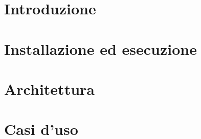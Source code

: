 \documentclass[a4paper, oneside, openany, dvipsnames, table]{article}
\begin{document}
\copertina{} 

\newpage
\tableofcontents
\newpage
\listoffigures
\newpage
\listoftables
\newpage

\section{Introduzione}

\newpage
\section{Installazione ed esecuzione}

\newpage
\section{Architettura}

\newpage
\section{Casi d'uso}

\end{document}
